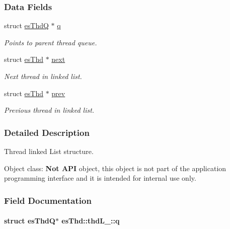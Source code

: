 \subsubsection*{Data Fields}
\begin{DoxyCompactItemize}
\item 
struct \hyperlink{structesThdQ}{es\-Thd\-Q} $\ast$ \hyperlink{structesThd_1_1thdL___a4f8a154ac7c5423b1ff21521ba25fd0b}{q}
\begin{DoxyCompactList}\small\item\em Points to parent thread queue. \end{DoxyCompactList}\item 
struct \hyperlink{structesThd}{es\-Thd} $\ast$ \hyperlink{structesThd_1_1thdL___accf72efa113ca485b742791d680d92bb}{next}
\begin{DoxyCompactList}\small\item\em Next thread in linked list. \end{DoxyCompactList}\item 
struct \hyperlink{structesThd}{es\-Thd} $\ast$ \hyperlink{structesThd_1_1thdL___a1c3a34dae1d17063950b672684c5917e}{prev}
\begin{DoxyCompactList}\small\item\em Previous thread in linked list. \end{DoxyCompactList}\end{DoxyCompactItemize}


\subsubsection{Detailed Description}
Thread linked List structure. 

\begin{DoxyParagraph}{Object class\-:}
{\bfseries Not A\-P\-I} object, this object is not part of the application programming interface and it is intended for internal use only. 
\end{DoxyParagraph}


\subsubsection{Field Documentation}
\hypertarget{structesThd_1_1thdL___a4f8a154ac7c5423b1ff21521ba25fd0b}{
\paragraph[{q}]{\setlength{\rightskip}{0pt plus 5cm}struct {\bf es\-Thd\-Q}$\ast$ es\-Thd\-::thd\-L\-\_\-\-::q}}\label{structesThd_1_1thdL___a4f8a154ac7c5423b1ff21521ba25fd0b}


